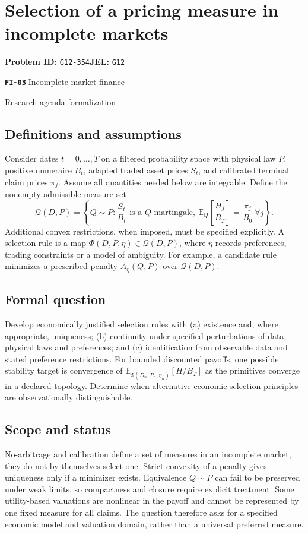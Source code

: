 \documentclass[11pt,a4paper]{article}
\newcommand{\E}{\mathbb E}
\newcommand{\entrymeta}[3]{{\sffamily\small\color{muted}\textbf{\texttt{#1}}\quad|\quad #2\par #3\par}}
\begin{document}
\section*{Selection of a pricing measure in incomplete markets}
\textbf{Problem ID:} \texttt{G12-354}\quad \textbf{JEL:} \texttt{G12}\par
\label{problem:OP-0580}
\label{beyond:FI-03}
\entrymeta{FI-03}{Incomplete-market finance}{Research agenda formalization}
\subsection*{Definitions and assumptions}
Consider dates $t=0,\ldots,T$ on a filtered probability space with physical law $P$, positive numeraire $B_t$, adapted traded asset prices $S_t$, and calibrated terminal claim prices $\pi_j$. Assume all quantities needed below are integrable. Define the nonempty admissible measure set
\[
 \mathcal Q(D,P)=\left\{Q\sim P:\frac{S_t}{B_t}\text{ is a }Q\text{-martingale},\
 \E_Q\!\left[\frac{H_j}{B_T}\right]=\frac{\pi_j}{B_0}\ \forall j\right\}.
\]
Additional convex restrictions, when imposed, must be specified explicitly. A selection rule is a map $\Phi(D,P,\eta)\in\mathcal Q(D,P)$, where $\eta$ records preferences, trading constraints or a model of ambiguity. For example, a candidate rule minimizes a prescribed penalty $A_\eta(Q,P)$ over $\mathcal Q(D,P)$.
\subsection*{Formal question}
Develop economically justified selection rules with (a) existence and, where appropriate, uniqueness; (b) continuity under specified perturbations of data, physical laws and preferences; and (c) identification from observable data and stated preference restrictions. For bounded discounted payoffs, one possible stability target is convergence of $\E_{\Phi(D_n,P_n,\eta_n)}[H/B_T]$ as the primitives converge in a declared topology. Determine when alternative economic selection principles are observationally distinguishable.
\subsection*{Scope and status}
No-arbitrage and calibration define a set of measures in an incomplete market; they do not by themselves select one. Strict convexity of a penalty gives uniqueness only if a minimizer exists. Equivalence $Q\sim P$ can fail to be preserved under weak limits, so compactness and closure require explicit treatment. Some utility-based valuations are nonlinear in the payoff and cannot be represented by one fixed measure for all claims. The question therefore asks for a specified economic model and valuation domain, rather than a universal preferred measure.
\end{document}
